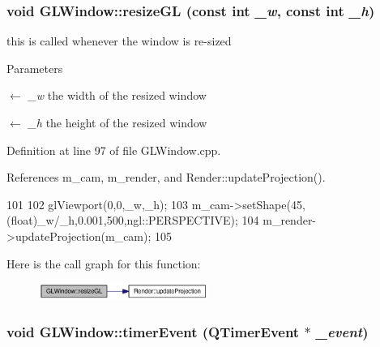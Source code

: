 \hypertarget{class_g_l_window_abe57c0f40e59cba4c98759121e22eb47}{
\subsubsection[{resizeGL}]{\setlength{\rightskip}{0pt plus 5cm}void GLWindow::resizeGL (const int {\em \_\-w}, \/  const int {\em \_\-h})}}
\label{class_g_l_window_abe57c0f40e59cba4c98759121e22eb47}


this is called whenever the window is re-\/sized 


\begin{DoxyParams}{Parameters}
\item[\mbox{$\leftarrow$} {\em \_\-w}]the width of the resized window \item[\mbox{$\leftarrow$} {\em \_\-h}]the height of the resized window \end{DoxyParams}


Definition at line 97 of file GLWindow.cpp.



References m\_\-cam, m\_\-render, and Render::updateProjection().




\begin{DoxyCode}
101 {
102   glViewport(0,0,_w,_h);
103   m_cam->setShape(45,(float)_w/_h,0.001,500,ngl::PERSPECTIVE);
104   m_render->updateProjection(m_cam);
105 }
\end{DoxyCode}




Here is the call graph for this function:\nopagebreak
\begin{figure}[H]
\begin{center}
\leavevmode
\includegraphics[width=157pt]{class_g_l_window_abe57c0f40e59cba4c98759121e22eb47_cgraph}
\end{center}
\end{figure}


\hypertarget{class_g_l_window_a8901509418ab117e8613d624df9b5666}{
\subsubsection[{timerEvent}]{\setlength{\rightskip}{0pt plus 5cm}void GLWindow::timerEvent (QTimerEvent $\ast$ {\em \_\-event})}}
\label{class_g_l_window_a8901509418ab117e8613d624df9b5666}


